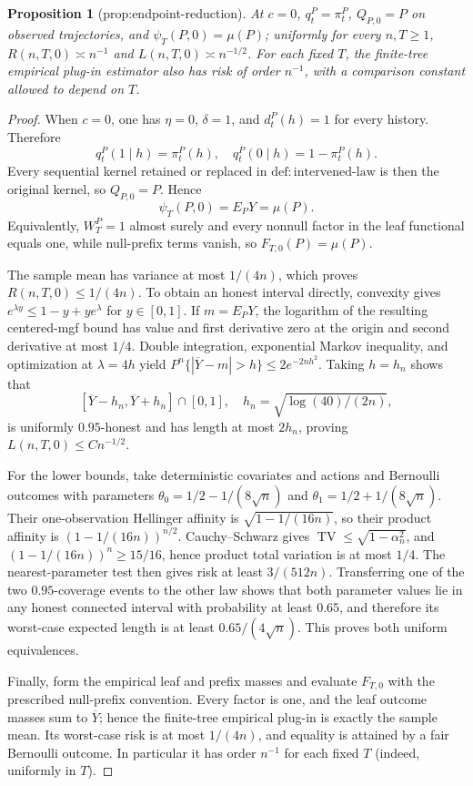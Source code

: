 \documentclass{article}
\newtheorem{proposition}{Proposition}
\begin{document}
\begin{proposition}[prop:endpoint-reduction]\label{prop:endpoint-reduction}
At \(c=0\), \(q_t^P=\pi_t^P\), \(Q_{P,0}=P\) on observed trajectories, and \(\psi_T(P,0)=\mu(P)\); uniformly for every \(n,T\geq1\), \(R(n,T,0)\asymp n^{-1}\) and \(L(n,T,0)\asymp n^{-1/2}\). For each fixed \(T\), the finite-tree empirical plug-in estimator also has risk of order \(n^{-1}\), with a comparison constant allowed to depend on \(T\).
\end{proposition}
\begin{proof}
When \(c=0\), one has \(\eta=0\), \(\delta=1\), and \(d_t^P(h)=1\) for every history.  Therefore
\[
 q_t^P(1\mid h)=\pi_t^P(h),\quad q_t^P(0\mid h)=1-\pi_t^P(h).
\]
Every sequential kernel retained or replaced in \(\mathrm{def:intervened\text{-}law}\) is then the original kernel, so \(Q_{P,0}=P\).  Hence
\[
 \psi_T(P,0)=E_PY=\mu(P).
\]
Equivalently, \(W_T^P=1\) almost surely and every nonnull factor in the leaf functional equals one, while null-prefix terms vanish, so \(F_{T,0}(P)=\mu(P)\).

The sample mean has variance at most \(1/(4n)\), which proves \(R(n,T,0)\leq1/(4n)\).  To obtain an honest interval directly, convexity gives \(e^{\lambda y}\leq1-y+ye^\lambda\) for \(y\in[0,1]\).  If \(m=E_PY\), the logarithm of the resulting centered-mgf bound has value and first derivative zero at the origin and second derivative at most \(1/4\).  Double integration, exponential Markov inequality, and optimization at \(\lambda=4h\) yield \(P^n\{|\overline Y-m|>h\}\leq2e^{-2nh^2}\).  Taking \(h=h_n\) shows that
\[
 [\overline Y-h_n,\overline Y+h_n]\cap[0,1],
 \quad h_n=\sqrt{\log(40)/(2n)},
\]
is uniformly \(0.95\)-honest and has length at most \(2h_n\), proving \(L(n,T,0)\leq Cn^{-1/2}\).

For the lower bounds, take deterministic covariates and actions and Bernoulli outcomes with parameters \(\theta_0=1/2-1/(8\sqrt n)\) and \(\theta_1=1/2+1/(8\sqrt n)\).  Their one-observation Hellinger affinity is \(\sqrt{1-1/(16n)}\), so their product affinity is \((1-1/(16n))^{n/2}\).  Cauchy--Schwarz gives \(\operatorname{TV}\leq\sqrt{1-\alpha_n^2}\), and \((1-1/(16n))^n\geq15/16\), hence product total variation is at most \(1/4\).  The nearest-parameter test then gives risk at least \(3/(512n)\).  Transferring one of the two \(0.95\)-coverage events to the other law shows that both parameter values lie in any honest connected interval with probability at least \(0.65\), and therefore its worst-case expected length is at least \(0.65/(4\sqrt n)\).  This proves both uniform equivalences.

Finally, form the empirical leaf and prefix masses and evaluate \(F_{T,0}\) with the prescribed null-prefix convention.  Every factor is one, and the leaf outcome masses sum to \(\overline Y\); hence the finite-tree empirical plug-in is exactly the sample mean.  Its worst-case risk is at most \(1/(4n)\), and equality is attained by a fair Bernoulli outcome.  In particular it has order \(n^{-1}\) for each fixed \(T\) (indeed, uniformly in \(T\)).
\end{proof}
\end{document}
